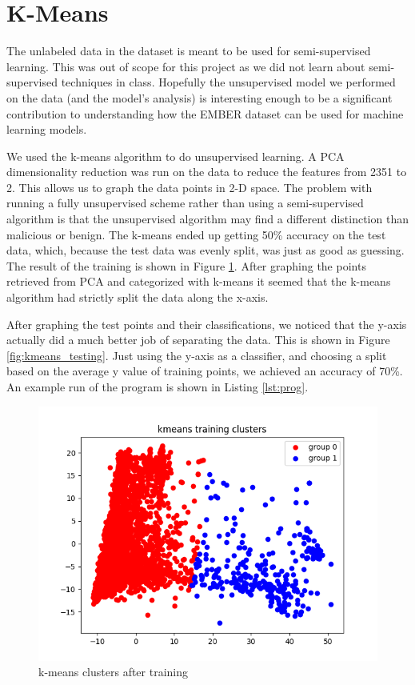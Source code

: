 \documentclass[12pt]{article}
\begin{document}
\section{K-Means}
\par
The unlabeled data in the dataset is meant to be used for semi-supervised learning.
This was out of scope for this project as we did not learn about semi-supervised techniques in class.
Hopefully the unsupervised model we performed on the data (and the model's analysis) is interesting enough to be a significant contribution to understanding how the EMBER dataset can be used for machine learning models.
\par
We used the k-means algorithm to do unsupervised learning. A PCA dimensionality reduction was run on the data to reduce the features from 2351 to 2. This allows us to graph the data points in 2-D space.
The problem with running a fully unsupervised scheme rather than using a semi-supervised algorithm is that the unsupervised algorithm may find a different distinction than malicious or benign.
The k-means ended up getting 50\% accuracy on the test data, which, because the test data was evenly split, was just as good as guessing. The result of the training is shown in Figure \ref{fig:kmeans_training}.
After graphing the points retrieved from PCA and categorized with k-means it seemed that the k-means algorithm had strictly split the data along the x-axis.
\par
After graphing the test points and their classifications, we noticed that the y-axis actually did a much better job of separating the data. This is shown in Figure \ref{fig:kmeans_testing}.
Just using the y-axis as a classifier, and choosing a split based on the average y value of training points, we achieved an accuracy of 70\%.
An example run of the program is shown in Listing \ref{lst:prog}.

\begin{figure}[ht]
\centering
\includegraphics[width=.5\textheight]{kmeans_clusters}
\caption{k-means clusters after training}
\label{fig:kmeans_training}
\end{figure}
\end{document}
